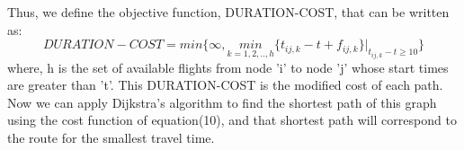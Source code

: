 \documentclass{article}
\begin{document}
  Thus, we define the objective function, DURATION-COST, that can be written as: \newline
  \begin{equation}
	  DURATION-COST = min \bigg \{ \infty, \underset{k=1,2,..,h}{min}{\{t_{ij,k} - t + f_{ij,k}\}\bigg |_{t_{ij,k}-t \geq 10}}  \bigg \}
  \end{equation}
 where, h is the set of available flights from node 'i' to node 'j' whose start times are greater than 't'. \newline
 This DURATION-COST is the modified cost of each path. Now we can apply Dijkstra's algorithm to find the shortest path of this graph using the cost function of equation(10), and that shortest path will correspond to the route for the smallest travel time. \newline
\end{document}
